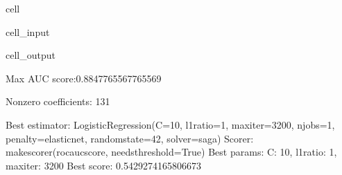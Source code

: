 \documentclass[letterpaper,10pt,english]{jupyterBook}
\begin{document}
\begin{sphinxuseclass}{cell}
\begin{sphinxVerbatimInput}
\begin{sphinxuseclass}{cell_input}
\end{sphinxuseclass}\end{sphinxVerbatimInput}
\begin{sphinxVerbatimOutput}

\begin{sphinxuseclass}{cell_output}
\begin{sphinxVerbatim}[commandchars=\\\{\}]
Max AUC score:0.8847765567765569

Non\PYGZhy{}zero coefficients: 131

Best estimator: LogisticRegression(C=10, l1\PYGZus{}ratio=1, max\PYGZus{}iter=3200, n\PYGZus{}jobs=\PYGZhy{}1,
                   penalty=\PYGZsq{}elasticnet\PYGZsq{}, random\PYGZus{}state=42, solver=\PYGZsq{}saga\PYGZsq{})
Scorer: make\PYGZus{}scorer(roc\PYGZus{}auc\PYGZus{}score, needs\PYGZus{}threshold=True)
Best params: \PYGZob{}\PYGZsq{}C\PYGZsq{}: 10, \PYGZsq{}l1\PYGZus{}ratio\PYGZsq{}: 1, \PYGZsq{}max\PYGZus{}iter\PYGZsq{}: 3200\PYGZcb{}
Best score: 0.5429274165806673
\end{sphinxVerbatim}


\end{sphinxuseclass}
\end{sphinxVerbatimOutput}
\end{sphinxuseclass}
\end{document}
